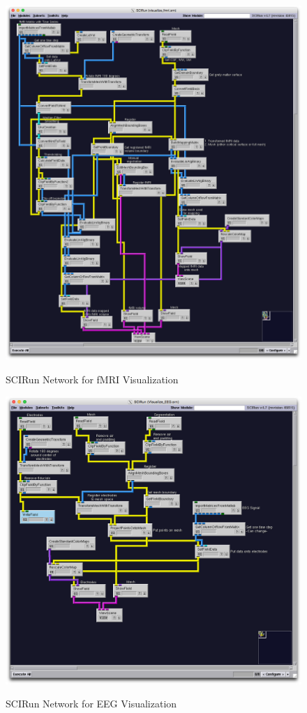 \begin{figure}[p]
\begin{center}
\includegraphics[width=\textwidth]{Figures/fmri_network.png}\\
\caption{SCIRun Network for fMRI Visualization}
\label{fig:fmrivisnet}
\end{center}
\end{figure}

\begin{figure}[p]
\begin{center}
\includegraphics[width=\textwidth]{Figures/EEG_network.png}\\
\caption{SCIRun Network for EEG Visualization}
\label{fig:eegvisnet}
\end{center}
\end{figure} 